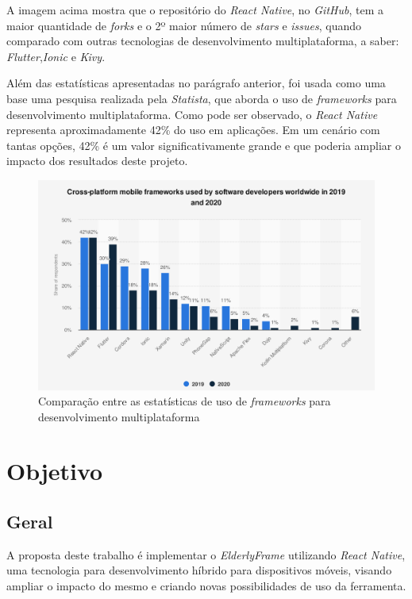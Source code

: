 \documentclass[
	12pt,				    %
	openright,			    %
	oneside,			    %
	a4paper,			    %
    sumario=tradicional,    %
	english,			    %
	brazil,				    %
	]{abntex2}              %
\begin{document}
A imagem acima mostra que o repositório do \textit{React Native}, no \textit{GitHub}, tem a maior quantidade de \textit{forks} e o 2º maior número de \textit{stars} e \textit{issues}, quando comparado com outras tecnologias de desenvolvimento multiplataforma, a saber: \textit{Flutter},\textit{Ionic} e \textit{Kivy}.

Além das estatísticas apresentadas no parágrafo anterior, foi usada como uma base uma pesquisa realizada pela \textit{Statista}, que aborda o uso de \textit{frameworks} para desenvolvimento multiplataforma. Como pode ser observado, o \textit{React Native} representa aproximadamente 42\% do uso em aplicações. Em um cenário com tantas opções, 42\% é um valor significativamente grande e que poderia ampliar o impacto dos resultados deste projeto.

\begin{figure}[H]
	\begin{center}
		\includegraphics[height=.5\linewidth]{mobile-frameworks-statista.png}
	\end{center}
	\caption[GitHub Compare]{Comparação entre as estatísticas de uso de \textit{frameworks} para desenvolvimento multiplataforma}
	\label{fig:statistaResearch}
\end{figure}

\chapter{Objetivo}\label{sec:objetivos}

\section{Geral}

A proposta deste trabalho é implementar o \emph{ElderlyFrame} utilizando \emph{React Native}, uma tecnologia para desenvolvimento híbrido para dispositivos móveis, visando ampliar o impacto do mesmo e criando novas possibilidades de uso da ferramenta.
\end{document}
